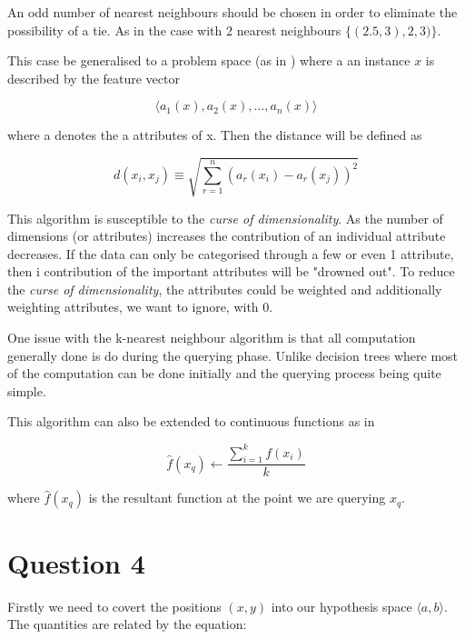 \documentclass[10pt,a4paper]{article}
\begin{document}
An odd number of nearest neighbours should be chosen in order to eliminate the possibility of a tie. As in the case with 2 nearest neighbours $\{(2.5,3),2,3)\}$.  

This case be generalised to a problem space (as in \cite{Michell2009}) where a an instance $x$ is described by the feature vector

\begin{equation}
\langle a_1 (x),a_2(x),...,a_n(x)\rangle
\end{equation} 

where a denotes the a attributes of x. Then the distance will be defined as 

\begin{equation}
d(x_i,x_j) \equiv \sqrt{\sum_{r=1}^n(a_r(x_i) - a_r(x_j))^2}
\end{equation}

\citep{Michell2009}

This algorithm is susceptible to the \emph{curse of dimensionality}. As the number of dimensions (or attributes) increases the contribution of an individual attribute decreases. If the data can only be categorised through a few or even 1 attribute, then i contribution of the important attributes will be "drowned out". \citep{Murphy} To reduce the \emph{curse of dimensionality}, the attributes could be weighted and additionally weighting attributes, we want to ignore, with 0.\citep{Michell2009}

One issue with the k-nearest neighbour algorithm is that all computation generally done is do during the querying phase. Unlike decision trees where most of the computation can be done initially and the querying process being quite simple. \citep{Michell2009}

This algorithm can also be extended to continuous functions as in

\begin{equation}
\hat{f}(x_q) \leftarrow \frac{\sum_{i=1}^k f(x_i)}{k}
\end{equation}

where $\hat{f}(x_q)$ is the resultant function at the point we are querying $x_q$.

\section{Question 4}

Firstly we need to covert the positions $(x,y)$ into our hypothesis space $\langle a,b \rangle$. The quantities are related by the equation: 
\end{document}
